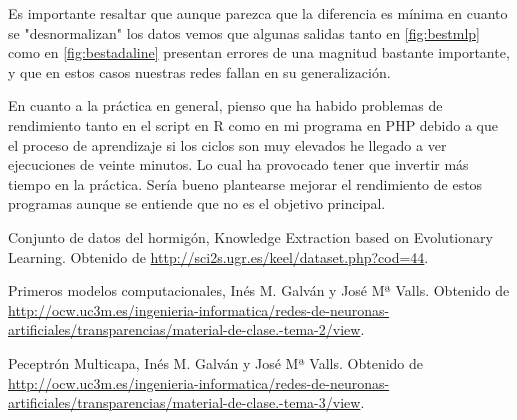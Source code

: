 \documentclass[11pt,spanish,listoffigures,listoftables]{workluis}
\begin{document}
\par Es importante resaltar que aunque parezca que la diferencia es mínima en cuanto se "desnormalizan" los datos vemos que algunas salidas tanto en \ref{fig:bestmlp} como en \ref{fig:bestadaline} presentan errores de una magnitud bastante importante, y que en estos casos nuestras redes fallan en su generalización.

\par En cuanto a la práctica en general, pienso que ha habido problemas de rendimiento tanto en el script en R como en mi programa en PHP debido a que el proceso de aprendizaje si los ciclos son muy elevados he llegado a ver ejecuciones de veinte minutos. Lo cual ha provocado tener que invertir más tiempo en la práctica. Sería bueno plantearse mejorar el rendimiento de estos programas aunque se entiende que no es el objetivo principal.


\begin{thebibliography}{10}


   Conjunto de datos del hormigón, 
   \newblock Knowledge Extraction based on Evolutionary Learning. 
   \newblock Obtenido de
   \url{http://sci2s.ugr.es/keel/dataset.php?cod=44}.

   Primeros modelos computacionales, 
   \newblock Inés M. Galván y José Mª Valls.
   \newblock Obtenido de
   \url{http://ocw.uc3m.es/ingenieria-informatica/redes-de-neuronas-artificiales/transparencias/material-de-clase.-tema-2/view}.

   Peceptrón Multicapa, 
   \newblock Inés M. Galván y José Mª Valls.
   \newblock Obtenido de
   \url{http://ocw.uc3m.es/ingenieria-informatica/redes-de-neuronas-artificiales/transparencias/material-de-clase.-tema-3/view}.

\end{thebibliography}
\cleardoublepage

\end{document}

